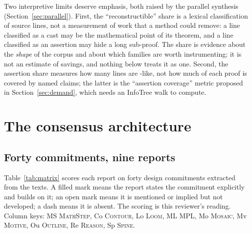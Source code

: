 \documentclass[11pt,a4paper]{article}
\newcommand{\code}[1]{\texttt{\detokenize{#1}}}
\newcommand{\MS}{\textsc{MathStep}}
\newcommand{\Co}{\textsc{Contour}}
\newcommand{\Lo}{\textsc{Loom}}
\newcommand{\ML}{\textsc{MPL}}
\newcommand{\Mo}{\textsc{Mosaic}}
\newcommand{\Mv}{\textsc{Motive}}
\newcommand{\Ou}{\textsc{Outline}}
\renewcommand{\Re}{\textsc{Reason}} %
\newcommand{\Sp}{\textsc{Spine}}
\theoremstyle{definition}
\begin{document}
Two interpretive limits deserve emphasis, both raised by the parallel synthesis (Section~\ref{sec:parallel}). First, the ``reconstructible'' share is a lexical classification of source lines, not a measurement of work that a method could remove: a line classified as a cast may be the mathematical point of its theorem, and a line classified as an assertion may hide a long sub-proof. The share is evidence about the \emph{shape} of the corpus and about which families are worth instrumenting; it is not an estimate of savings, and nothing below treats it as one. Second, the assertion share measures how many lines are \code{have}-like, not how much of each proof is covered by named claims; the latter is the ``assertion coverage'' metric proposed in Section~\ref{sec:demand}, which needs an InfoTree walk to compute.

\section{The consensus architecture}
\label{sec:consensus}

\subsection{Forty commitments, nine reports}
\label{sec:matrix}
Table~\ref{tab:matrix} scores each report on forty design commitments extracted from the texts. A filled mark means the report states the commitment explicitly and builds on it; an open mark means it is mentioned or implied but not developed; a dash means it is absent. The scoring is this reviewer's reading. Column keys: MS \MS, Co \Co, Lo \Lo, ML \ML, Mo \Mo, Mv \Mv, Ou \Ou, Re \Re, Sp \Sp.
\end{document}
